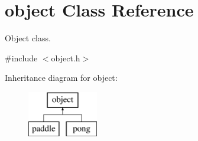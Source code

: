 \hypertarget{classobject}{}\section{object Class Reference}
\label{classobject}


Object class.  




{\ttfamily \#include $<$object.\+h$>$}

Inheritance diagram for object\+:\begin{figure}[H]
\begin{center}
\leavevmode
\includegraphics[height=2.000000cm]{classobject}
\end{center}
\end{figure}
